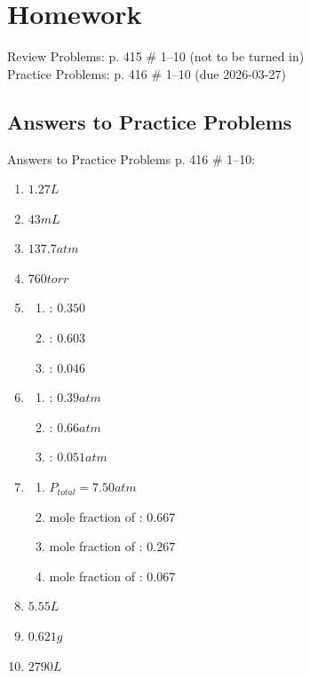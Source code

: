 \documentclass[11pt, oneside]{article}   	%
\begin{document}
\section{Homework}
Review Problems: p. 415 \# 1--10 (not to be turned in)\\
Practice Problems: p. 416 \# 1--10 (due 2026-03-27)\\

\nocite{wile-chem-2}



\clearpage
\subsection{Answers to Practice Problems}
Answers to Practice Problems p. 416 \# 1--10:
\begin{enumerate}
\item $1.27 L$

\item $43 mL$

\item $137.7 atm$

\item $760 torr$

\item 
\begin{enumerate}
\item {} : $0.350$
\item {} : $0.603$
\item {}: $0.046$
\end{enumerate}

\item 
\begin{enumerate}
\item {} : $0.39 atm$
\item {} : $0.66 atm$
\item {}: $0.051 atm$
\end{enumerate}

\item 
\begin{enumerate}
\item $P_{total} = 7.50 atm$
\item mole fraction of  : $0.667$
\item mole fraction of  : $0.267$
\item mole fraction of : $0.067$
\end{enumerate}

\item $5.55 L$

\item $0.621 g$

\item $2790 L$

\end{enumerate}
\end{document}
